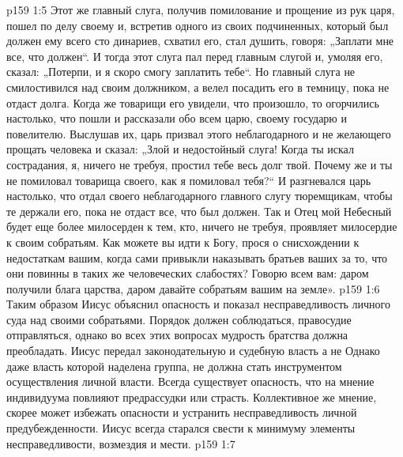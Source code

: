 \vs p159 1:5 Этот же главный слуга, получив помилование и прощение из рук царя, пошел по делу своему и, встретив одного из своих подчиненных, который был должен ему всего сто динариев, схватил его, стал душить, говоря: „Заплати мне все, что должен“. И тогда этот слуга пал перед главным слугой и, умоляя его, сказал: „Потерпи, и я скоро смогу заплатить тебе“. Но главный слуга не смилостивился над своим должником, а велел посадить его в темницу, пока не отдаст долга. Когда же товарищи его увидели, что произошло, то огорчились настолько, что пошли и рассказали обо всем царю, своему государю и повелителю. Выслушав их, царь призвал этого неблагодарного и не желающего прощать человека и сказал: „Злой и недостойный слуга! Когда ты искал сострадания, я, ничего не требуя, простил тебе весь долг твой. Почему же и ты не помиловал товарища своего, как я помиловал тебя?“ И разгневался царь настолько, что отдал своего неблагодарного главного слугу тюремщикам, чтобы те держали его, пока не отдаст все, что был должен. Так и Отец мой Небесный будет еще более милосерден к тем, кто, ничего не требуя, проявляет милосердие к своим собратьям. Как можете вы идти к Богу, прося о снисхождении к недостаткам вашим, когда сами привыкли наказывать братьев ваших за то, что они повинны в таких же человеческих слабостях? Говорю всем вам: даром получили блага царства, даром давайте собратьям вашим на земле».
\vs p159 1:6 \pc Таким образом Иисус объяснил опасность и показал несправедливость личного суда над своими собратьями. Порядок должен соблюдаться, правосудие отправляться, однако во всех этих вопросах мудрость братства должна преобладать. Иисус передал законодательную и судебную власть  а не  Однако даже власть которой наделена группа, не должна стать инструментом осуществления личной власти. Всегда существует опасность, что на мнение индивидуума повлияют предрассудки или страсть. Коллективное же мнение, скорее может избежать опасности и устранить несправедливость личной предубежденности. Иисус всегда старался свести к минимуму элементы несправедливости, возмездия и мести.
\vs p159 1:7 
